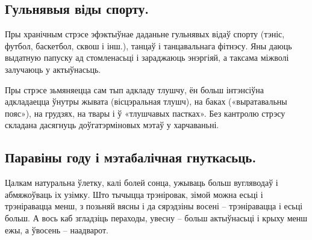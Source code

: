 \subsection{Гульнявыя віды спорту.}
Пры хранічным стрэсе эфэктыўнае даданьне гульнявых відаў спорту (тэніс, футбол, баскетбол, сквош і інш.), танцаў і танцавальнага фітнэсу. Яны даюць выдатную папуску ад стомленасьці і зараджаюць энэргіяй, а таксама міжволі залучаюць у актыўнасьць.

Пры стрэсе зьмяняецца сам тып адкладу тлушчу, ён больш інтэнсіўна адкладаецца ўнутры жывата (вісцэральная тлушч), на баках («выратавальны пояс»), на грудзях, на твары і ў «тлушчавых пастках». Без кантролю стрэсу складана дасягнуць доўгатэрміновых мэтаў у харчаваньні.

\subsection{Паравіны году і мэтабалічная гнуткасьць.}
Цалкам натуральна ўлетку, калі болей сонца, ужываць больш вугляводаў і абмяжоўваць іх узімку. Што тычыцца трэніровак, зімой можна есьці і трэніравацца менш, з позьняй вясны і да сярэдзіны восені – трэніравацца і есьці больш. А вось каб згладзіць пераходы, увесну – больш актыўнасьці і крыху менш ежы, а ўвосень – наадварот.
